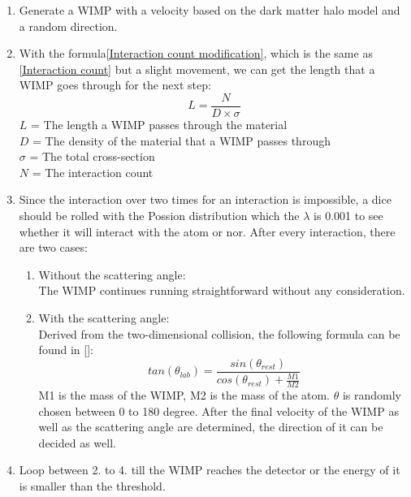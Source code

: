 \begin{enumerate}
	\item Generate a WIMP with a velocity based on the dark matter halo model and a random direction.\\
	\item With the formula\ref{Interaction count modification}, which is the same as \ref{Interaction count} but a slight movement, we can get the length that a WIMP goes through for the next step:\\
	\begin{equation}
        \label{Interaction count modification}
	L = \frac{N}{D \times \sigma}
        \end{equation}
        $L$ = The length a WIMP passes through the material\\
        $D$ = The density of the material that a WIMP passes through\\
        $\sigma$ = The total cross-section\\
        $N$ = The interaction count\\ 
	\item Since the interaction over two times for an interaction is impossible, a dice should be rolled with the Possion distribution which the $\lambda$ is 0.001 to see whether it will interact with the atom or nor. After every interaction, there are two cases:\\
	\begin{enumerate}
		\item Without the scattering angle:\\
		The WIMP continues running straightforward without any consideration.\\
		\item With the scattering angle:\\
		Derived from the two-dimensional collision, the following formula can be found in \ref{}:
		\begin{equation}
                 \label{Interaction count modification}
    		tan(\theta_{lab}) = \frac{sin(\theta_{rest})}{cos(\theta_{rest})+\frac{M1}{M2}}
                 \end{equation}
		M1 is the mass of the WIMP, M2 is the mass of the atom. $\theta$ is randomly chosen between 0 to 180 degree. After the final velocity of the WIMP as well as the scattering angle are determined, the direction of it can be decided as well.\\
	\end{enumerate} 
	\item Loop between 2. to 4. till the WIMP reaches the detector or the energy of it is smaller than the threshold.\\
\end{enumerate}

